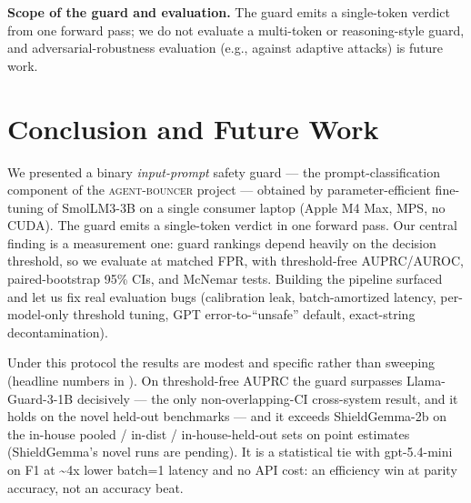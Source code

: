 \documentclass[sigconf,nonacm]{acmart}
\begin{document}
\textbf{Scope of the guard and evaluation.} The guard emits a single-token verdict from one forward pass; we do not evaluate a multi-token or reasoning-style guard, and adversarial-robustness evaluation (e.g., against adaptive attacks) is future work.

\section{Conclusion and Future Work}

We presented a binary \emph{input-prompt} safety guard --- the prompt-classification component of the \textsc{agent-bouncer} project --- obtained by parameter-efficient fine-tuning of SmolLM3-3B on a single consumer laptop (Apple M4 Max, MPS, no CUDA). The guard emits a single-token verdict in one forward pass. Our central finding is a measurement one: guard rankings depend heavily on the decision threshold, so we evaluate at matched FPR, with threshold-free AUPRC/AUROC, paired-bootstrap 95\% CIs, and McNemar tests. Building the pipeline surfaced and let us fix real evaluation bugs (calibration leak, batch-amortized latency, per-model-only threshold tuning, GPT error-to-``unsafe'' default, exact-string decontamination).

Under this protocol the results are modest and specific rather than sweeping (headline numbers in ). On threshold-free AUPRC the guard surpasses Llama-Guard-3-1B decisively --- the only non-overlapping-CI cross-system result, and it holds on the novel held-out benchmarks --- and it exceeds ShieldGemma-2b on the in-house pooled / in-dist / in-house-held-out sets on point estimates (ShieldGemma's novel runs are pending). It is a statistical tie with gpt-5.4-mini on F1 at \textasciitilde{}4x lower batch=1 latency and no API cost: an efficiency win at parity accuracy, not an accuracy beat.
\end{document}
